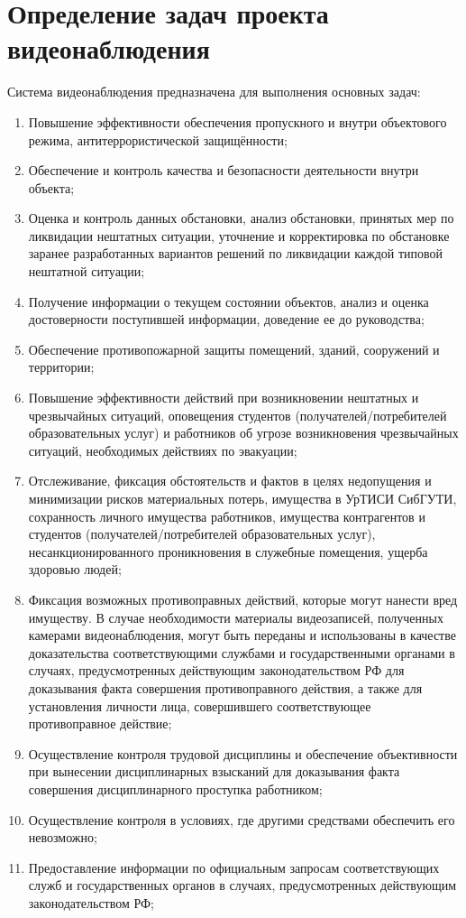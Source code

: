 \section{Определение задач проекта видеонаблюдения}

Система видеонаблюдения предназначена для выполнения основных задач:

\begin{enumerate}
    \item Повышение эффективности обеспечения пропускного и внутри объектового режима, антитеррористической защищённости;
    \item Обеспечение и контроль качества и безопасности деятельности внутри объекта;
    \item Оценка и контроль данных обстановки, анализ обстановки, принятых мер по ликвидации нештатных ситуации, уточнение и корректировка по обстановке заранее разработанных вариантов решений по ликвидации каждой типовой нештатной ситуации;
    \item Получение информации о текущем состоянии объектов, анализ и оценка достоверности поступившей информации, доведение ее до руководства;
    \item Обеспечение противопожарной защиты помещений, зданий, сооружений и территории;
    \item Повышение эффективности действий при возникновении нештатных и чрезвычайных ситуаций, оповещения студентов (получателей/потребителей образовательных услуг) и работников об угрозе возникновения чрезвычайных ситуаций, необходимых действиях по эвакуации;
    \item Отслеживание, фиксация обстоятельств и фактов в целях недопущения и минимизации рисков материальных потерь, имущества в УрТИСИ СибГУТИ, сохранность личного имущества работников, имущества контрагентов и студентов (получателей/потребителей образовательных услуг), несанкционированного проникновения в служебные помещения, ущерба здоровью людей;
    \item Фиксация возможных противоправных действий, которые могут нанести вред имуществу. В случае необходимости материалы видеозаписей, полученных камерами видеонаблюдения, могут быть переданы и использованы в качестве доказательства соответствующими службами и государственными органами в случаях, предусмотренных действующим законодательством РФ для доказывания факта совершения противоправного действия, а также для установления личности лица, совершившего соответствующее противоправное действие;
    \item Осуществление контроля трудовой дисциплины и обеспечение объективности при вынесении дисциплинарных взысканий для доказывания факта совершения дисциплинарного проступка работником;
    \item Осуществление контроля в условиях, где другими средствами обеспечить его невозможно;
    \item Предоставление информации по официальным запросам соответствующих служб и государственных органов в случаях, предусмотренных действующим законодательством РФ;
\end{enumerate}
